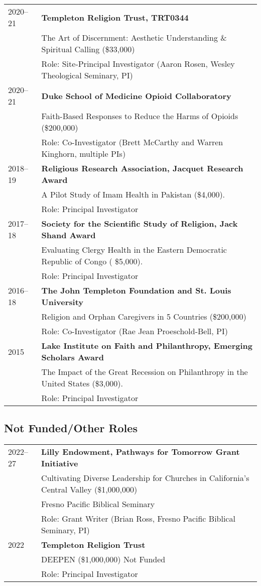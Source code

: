 \begin{longtable}{p{} p{}}
2020--21 & \textbf{Templeton Religion Trust, TRT0344} \\
& The Art of Discernment: Aesthetic Understanding \& Spiritual Calling (\$33,000)\\
& Role: Site-Principal Investigator (Aaron Rosen, Wesley Theological Seminary, PI)\\

2020--21 & \textbf{Duke School of Medicine Opioid Collaboratory}\\
& Faith-Based Responses to Reduce the Harms of Opioids (\$200,000) \\
& Role: Co-Investigator (Brett McCarthy and Warren Kinghorn, multiple PIs)\\

2018--19 & \textbf{Religious Research Association, Jacquet Research Award}\\
& A Pilot Study of Imam Health in Pakistan (\$4,000). \\
& Role: Principal Investigator\\

2017--18 & \textbf{Society for the Scientific Study of Religion, Jack Shand Award} \\
& Evaluating Clergy Health in the Eastern Democratic Republic of Congo ( \$5,000). \\
& Role: Principal Investigator\\

2016--18 & \textbf{The John Templeton Foundation and St. Louis University}\\
& Religion and Orphan Caregivers in 5 Countries (\$200,000)\\
& Role: Co-Investigator (Rae Jean Proeschold-Bell, PI)\\

2015 & \textbf{Lake Institute on Faith and Philanthropy, Emerging Scholars Award} \\
& The Impact of the Great Recession on Philanthropy in the United States (\$3,000). \\
& Role: Principal Investigator\\
\end{longtable}

\subsection*{Not Funded/Other Roles}
\begin{longtable}{p{} p{}}
2022--27 & \textbf{Lilly Endowment, Pathways for Tomorrow Grant Initiative} \\
& Cultivating Diverse Leadership for Churches in California’s Central Valley (\$1,000,000)\\
& Fresno Pacific Biblical Seminary\\
& Role: Grant Writer (Brian Ross, Fresno Pacific Biblical Seminary, PI)\\
2022 & \textbf{Templeton Religion Trust} \\
& DEEPEN (\$1,000,000) Not Funded \\
& Role: Principal Investigator\\
\end{longtable}
